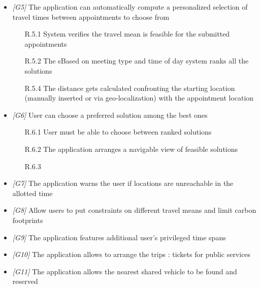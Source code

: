\begin{itemize}
\begin{itemize}
                 \end{itemize}

\item \textit{[G5]} The application can automatically compute a personalized selection of travel times between appointments to choose from

                  \begin{itemize}
                        \item [R.5.1] System verifies the travel mean is feasible for the submitted appointments
                        \item [R.5.2] The sBased on meeting type and time of day system ranks all the solutions
                        \item [R.5.4] The distance gets calculated confronting the starting location (manually inserted or via geo-localization) with the appointment location
                        
                  \end{itemize}
                  
\item \textit{[G6]} User can choose a preferred solution among the best ones 

                   \begin{itemize}
                        \item [R.6.1] User must be able to choose between ranked solutions
                        \item [R.6.2] The application arranges a navigable view of feasible solutions
                        \item [R.6.3] 
                  \end{itemize}
                  
\item \textit{[G7]} The application warns the user if locations are unreachable in the allotted time 

\item \textit{[G8]} Allow users to put constraints on different travel means and limit carbon footprints

\item \textit{[G9]} The application features additional user’s privileged time spans 

\item \textit{[G10]} The application allows to arrange the trips : tickets for public services

\item \textit{[G11]} The application allows the nearest shared vehicle to be found and reserved


\end{itemize}
